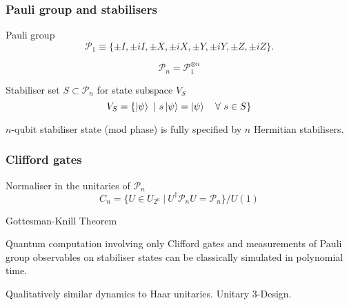 \documentclass[9pt]{beamer}
\begin{document}
\begin{frame}
\frametitle{Pauli group and stabilisers}

Pauli group
\begin{equation}
\mathcal{P}_1 \equiv \{\pm I, \pm i I, \pm X, \pm i X, \pm Y, \pm i Y, \pm Z, \pm i Z\}.
\end{equation}

\begin{equation}
\mathcal{P}_n = \mathcal{P}_1^{\otimes n}
\end{equation} 


\pause
\vspace{0.5cm}
Stabiliser set $S \subset \mathcal{P}_n$ for state subspace $V_S$
\begin{equation}
V_S = \{\ket{\psi} \ | \ s \ket{\psi} = \ket{\psi} \quad \forall \ s \in S \}
\end{equation}

$n$-qubit stabiliser state (mod phase) is fully specified by $n$ Hermitian stabilisers.

\end{frame}



\begin{frame}
\frametitle{Clifford gates}

Normaliser in the unitaries of $\mathcal{P}_n$  
\begin{equation}
C_n = \{U \in U_{2^n} \ | \ U^\dagger \mathcal{P}_n U = \mathcal{P}_n\} / U(1)
\end{equation}

\pause
Gottesman-Knill Theorem
\begin{displayquote}
Quantum computation involving only Clifford gates and measurements of Pauli group observables on stabiliser states can be classically simulated in polynomial time.
\end{displayquote}

\pause 
Qualitatively similar dynamics to Haar unitaries. Unitary 3-Design. 

\end{frame}
\end{document}
